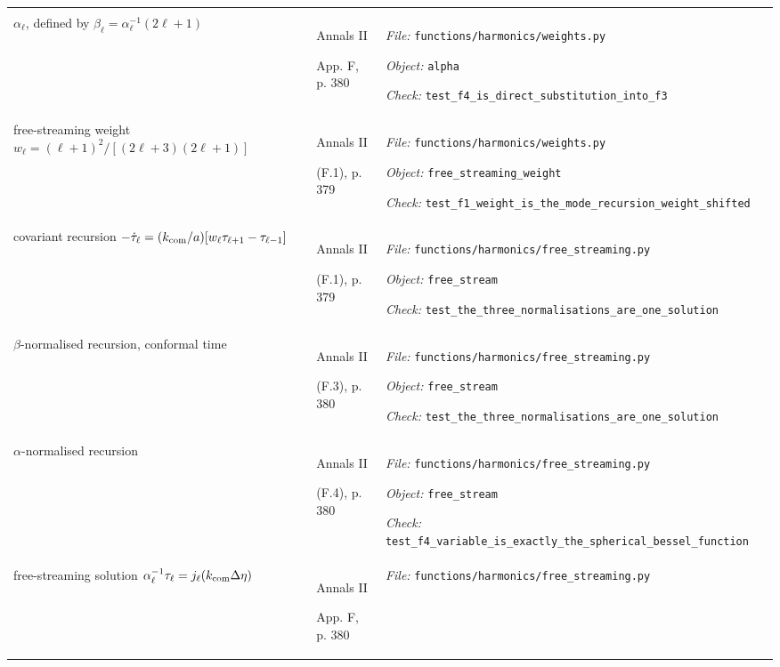 \begin{landscape}
\begin{longtable}{@{}>{\raggedright\arraybackslash}p{80mm}
                     >{\raggedright\arraybackslash}p{38mm}
                     >{\raggedright\arraybackslash}p{99mm}@{}}
{\textit{Object:} \nolinkurl{delta_over_four_pi}\par
\textit{Check:} ---} \\
\addlinespace[2pt]
$\alpha_\ell$, defined by $\beta_\ell = \alpha_\ell^{-1}(2\ell+1)$ & Annals II\par App. F, p. 380 & {\scriptsize \textit{File:} \nolinkurl{functions/harmonics/weights.py}\par
\textit{Object:} \nolinkurl{alpha}\par
\textit{Check:} \nolinkurl{test_f4_is_direct_substitution_into_f3}} \\
\addlinespace[2pt]
free-streaming weight $w_\ell = (\ell+1)^2/[(2\ell+3)(2\ell+1)]$ & Annals II\par (F.1), p. 379 & {\scriptsize \textit{File:} \nolinkurl{functions/harmonics/weights.py}\par
\textit{Object:} \nolinkurl{free_streaming_weight}\par
\textit{Check:} \nolinkurl{test_f1_weight_is_the_mode_recursion_weight_shifted}} \\
\addlinespace[2pt]
covariant recursion $-\dot\tau_\ell = (k_{\rm com}/a)[w_\ell\tau_{\ell+1}-\tau_{\ell-1}]$ & Annals II\par (F.1), p. 379 & {\scriptsize \textit{File:} \nolinkurl{functions/harmonics/free_streaming.py}\par
\textit{Object:} \nolinkurl{free_stream}\par
\textit{Check:} \nolinkurl{test_the_three_normalisations_are_one_solution}} \\
\addlinespace[2pt]
$\beta$-normalised recursion, conformal time & Annals II\par (F.3), p. 380 & {\scriptsize \textit{File:} \nolinkurl{functions/harmonics/free_streaming.py}\par
\textit{Object:} \nolinkurl{free_stream}\par
\textit{Check:} \nolinkurl{test_the_three_normalisations_are_one_solution}} \\
\addlinespace[2pt]
$\alpha$-normalised recursion & Annals II\par (F.4), p. 380 & {\scriptsize \textit{File:} \nolinkurl{functions/harmonics/free_streaming.py}\par
\textit{Object:} \nolinkurl{free_stream}\par
\textit{Check:} \nolinkurl{test_f4_variable_is_exactly_the_spherical_bessel_function}} \\
\addlinespace[2pt]
free-streaming solution $\alpha_\ell^{-1}\tau_\ell = j_\ell(k_{\rm com}\Delta\eta)$ & Annals II\par App. F, p. 380 & {\scriptsize \textit{File:} \nolinkurl{functions/harmonics/free_streaming.py}\par
}
\end{longtable}
\end{landscape}
